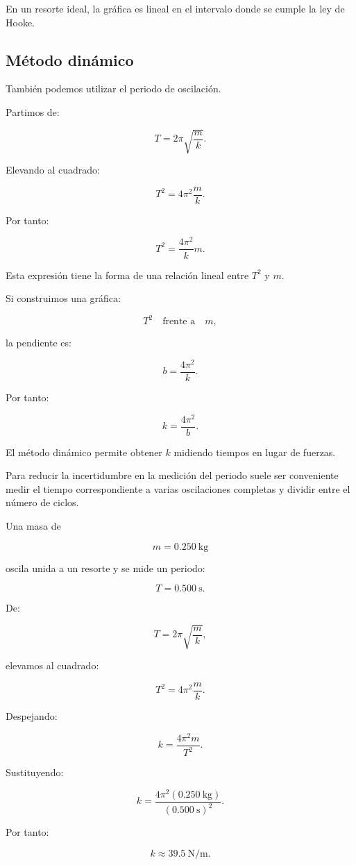 En un resorte ideal, la gráfica es lineal en el intervalo donde se cumple la ley de Hooke.


\subsection{Método dinámico}

También podemos utilizar el periodo de oscilación.

Partimos de:

\[ T=2\pi\sqrt{\frac{m}{k}}. \]

Elevando al cuadrado:

\[ T^2=4\pi^2\frac{m}{k}. \]

Por tanto:

\[ \boxed{T^2=\frac{4\pi^2}{k}m}. \]

Esta expresión tiene la forma de una relación lineal entre \(T^2\) y \(m\).

Si construimos una gráfica:

\[ T^2\quad\text{frente a}\quad m, \]

la pendiente es:

\[ b=\frac{4\pi^2}{k}. \]

Por tanto:

\[ \boxed{k=\frac{4\pi^2}{b}}. \]

\begin{interpretacion}
El método dinámico permite obtener \(k\) midiendo tiempos en lugar de fuerzas.

Para reducir la incertidumbre en la medición del periodo suele ser conveniente medir el tiempo correspondiente a varias oscilaciones completas y dividir entre el número de ciclos.
\end{interpretacion}

\begin{ejemplo}
Una masa de

\[ m=\SI{0.250}{\kilogram} \]

oscila unida a un resorte y se mide un periodo:

\[ T=\SI{0.500}{\second}. \]

De:

\[ T=2\pi\sqrt{\frac{m}{k}}, \]

elevamos al cuadrado:

\[ T^2=4\pi^2\frac{m}{k}. \]

Despejando:

\[ k=\frac{4\pi^2m}{T^2}. \]

Sustituyendo:

\[
k
=
\frac{
4\pi^2(\SI{0.250}{\kilogram})
}{
(\SI{0.500}{\second})^2
}.
\]

Por tanto:

\[ \boxed{k\approx\SI{39.5}{\newton\per\meter}}. \]
\end{ejemplo}


